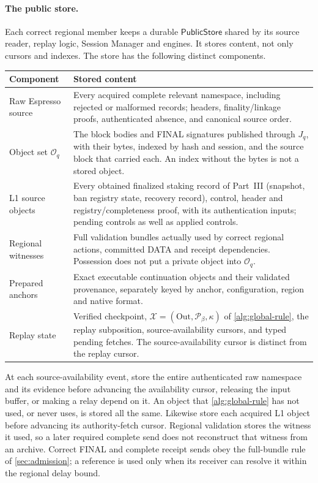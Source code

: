 \documentclass[11pt,a4paper]{article}
\newcommand{\tagg}[1]{\ensuremath{\mathsf{#1}}}
\begin{document}
\paragraph{The public store.}
Each correct regional member keeps a durable \tagg{PublicStore} shared
by its source reader, replay logic, Session Manager and engines. It stores content, not only cursors and indexes. The store
has the following distinct components.
\begin{table}[htbp]\centering\small
\begin{tabularx}{\linewidth}{@{}>{\raggedright\arraybackslash}p{.24\linewidth}Y@{}}\toprule
Component & Stored content\\\midrule
Raw Espresso source & Every acquired complete relevant namespace,
including rejected or malformed records; headers, finality/linkage
proofs, authenticated absence, and canonical source order.\\
Object set $\mathcal O_q$ & The block bodies and FINAL signatures
published through $J_q$, with their bytes, indexed by hash and session,
and the source block that carried each. An index without the bytes is
not a stored object.\\
L1 source objects & Every obtained finalized staking record of Part~III
(snapshot, ban registry state, recovery record), control, header and
registry/completeness proof, with its authentication inputs;
pending controls as well as applied controls.\\
Regional witnesses & Full validation bundles actually used by correct
regional actions, committed DATA and receipt dependencies. Possession
does not put a private object into $\mathcal O_q$.\\
Prepared anchors & Exact executable continuation objects and their
validated provenance, separately keyed by anchor, configuration,
region and native format.\\
Replay state & Verified checkpoint,
$\mathcal X=(\mathrm{Out},\mathcal P_\beta,\kappa)$ of \cref{alg:global-rule}, the replay subposition,
source-availability cursors, and typed pending fetches.
The source-availability cursor is distinct from the replay cursor.\\\bottomrule
\end{tabularx}
\end{table}

At each source-availability event, store the entire authenticated raw
namespace and its evidence before advancing the availability cursor,
releasing the input buffer, or making a relay depend on it. An object
that \cref{alg:global-rule} has not used, or never uses, is stored all
the same. Likewise store each acquired L1
object before advancing its authority-fetch cursor. Regional validation
stores the witness it used, so a later required complete send does not
reconstruct that witness from an archive. Correct FINAL and complete
receipt sends obey the full-bundle rule of \cref{sec:admission}; a
reference is used only when its receiver can resolve it within the
regional delay bound.
\end{document}
